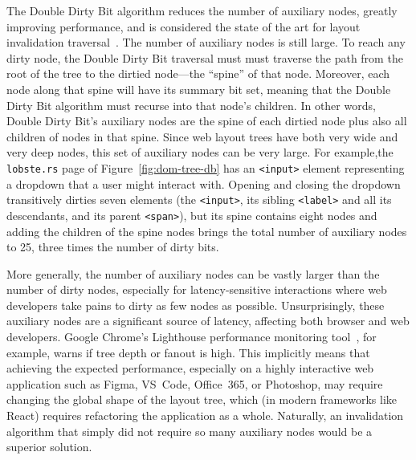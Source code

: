 The Double Dirty Bit algorithm
  reduces the number of auxiliary nodes,
  greatly improving performance,
  and is considered the state of the art
  for layout invalidation traversal~\cite{tali-garseil,wbe}.
The number of auxiliary nodes is still large.
To reach any dirty node,
  the Double Dirty Bit traversal must
  must traverse the path from the root of the tree
  to the dirtied node---the ``spine'' of that node.
Moreover, each node along that spine
  will have its summary bit set,
  meaning that the Double Dirty Bit algorithm
  must recurse into that node's children.
In other words,
  Double Dirty Bit's auxiliary nodes
  are the spine of each dirtied node
  plus also all children of nodes in that spine.
Since web layout trees have both very wide and very deep nodes,
  this set of auxiliary nodes can be very large.
For example,the \texttt{lobste.rs} page of Figure~\ref{fig:dom-tree-db}
  has an \texttt{<input>} element representing
  a dropdown that a user might interact with.
Opening and closing the dropdown transitively dirties seven elements
  (the \texttt{<input>},
    its sibling \texttt{<label>} and all its descendants,
    and its parent \texttt{<span>}),
  but its spine contains eight nodes
  and adding the children of the spine nodes
  brings the total number of auxiliary nodes to 25,
  three times the number of dirty bits.

More generally, the number of auxiliary nodes
  can be vastly larger than the number of dirty nodes,
  especially for latency-sensitive interactions
  where web developers take pains to dirty
  as few nodes as possible.
Unsurprisingly, these auxiliary nodes
  are a significant source of latency,
  affecting both browser and web developers.
Google Chrome's Lighthouse performance monitoring tool~\cite{lighthouse},
  for example, warns if tree depth or fanout is high.
This implicitly means that achieving the expected performance,
  especially on a highly interactive web application
  such as Figma, VS~Code, Office~365, or Photoshop,
  may require changing the global shape of the layout tree,
  which (in modern frameworks like React)
  requires refactoring the application as a whole.
Naturally, an invalidation algorithm that simply
  did not require so many auxiliary nodes
  would be a superior solution.

